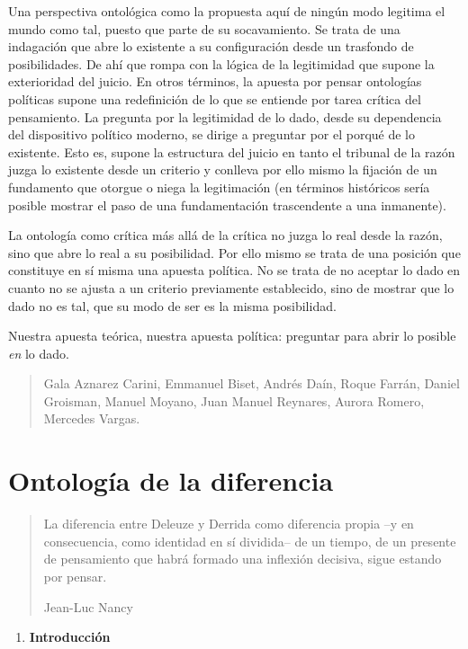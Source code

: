 \documentclass{book}
\begin{document}
Una perspectiva ontológica como la propuesta aquí de ningún modo
legitima el mundo como tal, puesto que parte de su socavamiento. Se
trata de una indagación que abre lo existente a su configuración desde
un trasfondo de posibilidades. De ahí que rompa con la lógica de la
legitimidad que supone la exterioridad del juicio. En otros términos, la
apuesta por pensar ontologías políticas supone una redefinición de lo
que se entiende por tarea crítica del pensamiento. La pregunta por la
legitimidad de lo dado, desde su dependencia del dispositivo político
moderno, se dirige a preguntar por el porqué de lo existente. Esto es,
supone la estructura del juicio en tanto el tribunal de la razón juzga
lo existente desde un criterio y conlleva por ello mismo la fijación de
un fundamento que otorgue o niega la legitimación (en términos
históricos sería posible mostrar el paso de una fundamentación
trascendente a una inmanente).

La ontología como crítica más allá de la crítica no juzga lo real desde
la razón, sino que abre lo real a su posibilidad. Por ello mismo se
trata de una posición que constituye en sí misma una apuesta política.
No se trata de no aceptar lo dado en cuanto no se ajusta a un criterio
previamente establecido, sino de mostrar que lo dado no es tal, que su
modo de ser es la misma posibilidad.

Nuestra apuesta teórica, nuestra apuesta política: preguntar para abrir
lo posible \emph{en} lo dado.

\begin{quote}
Gala Aznarez Carini, Emmanuel Biset, Andrés Daín, Roque Farrán, Daniel
Groisman, Manuel Moyano, Juan Manuel Reynares, Aurora Romero, Mercedes
Vargas.
\end{quote}

\chapter{Ontología de la diferencia}

\author{Emmanuel Biset}

\begin{quote}
La diferencia entre Deleuze y Derrida como diferencia propia --y en
consecuencia, como identidad en sí dividida-- de un tiempo, de un
presente de pensamiento que habrá formado una inflexión decisiva, sigue
estando por pensar.

Jean-Luc Nancy
\end{quote}

\begin{enumerate}
\def\labelenumi{\arabic{enumi}.}
\item
  \textbf{Introducción}
\end{enumerate}
\end{document}
